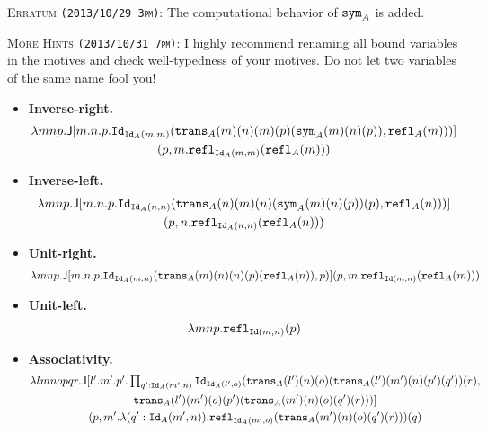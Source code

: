 \documentclass[12pt]{article}
\newcommand{\cut}[1]{}
\newcommand{\marksolution}[1]{\color{FireBrick}#1\normalcolor}%
\newcommand{\marksolution}[1]{\cut{#1}}%
\newenvironment{solution}{\trivlist \item[\hskip \labelsep{\bf
Solution:}]}{\endtrivlist}
\newcommand{\markextra}[1]{\color{DarkOliveGreen}#1\normalcolor}
\begin{document}
\markextra{
  \begin{mdframed}[style=extra]
    \textsc{Erratum \texttt{(2013/10/29 3pm)}:}
    The computational behavior of $\mathtt{sym}_A$ is added.
  \end{mdframed}
}
\markextra{
  \begin{mdframed}[style=extra]
    \textsc{More Hints \texttt{(2013/10/31 7pm)}:}
    I highly recommend renaming all bound variables in the motives
    and check well-typedness of your motives.
    Do not let two variables of the same name fool you!
  \end{mdframed}
}

\marksolution{
\begin{solution}\mbox{}
  \begin{itemize}
    \item\textbf{Inverse-right.}
      \begin{multline*}
        \lambda mnp.\mathsf{J}[m.n.p.\mathtt{Id}_{\mathtt{Id}_A(m,m)}(\mathtt{trans}_A(m)(n)(m)(p)(\mathtt{sym}_A(m)(n)(p)), \mathtt{refl}_A(m)))]
        \\(p,m.\mathtt{refl}_{\mathtt{Id}_A(m,m)}(\mathtt{refl}_A(m)))
      \end{multline*}
    \item\textbf{Inverse-left.}
      \begin{multline*}
        \lambda mnp.\mathsf{J}[m.n.p.\mathtt{Id}_{\mathtt{Id}_A(n,n)}(\mathtt{trans}_A(n)(m)(n)(\mathtt{sym}_A(m)(n)(p))(p), \mathtt{refl}_A(n)))]\\
        (p,n.\mathtt{refl}_{\mathtt{Id}_A(n,n)}(\mathtt{refl}_A(n)))
      \end{multline*}
    \item\textbf{Unit-right.}
      \begin{multline*}
        \lambda mnp.\mathsf{J}[m.n.p.\mathtt{Id}_{\mathtt{Id}_A(m,n)}(\mathtt{trans}_A(m)(n)(n)(p)(\mathtt{refl}_A(n)), p)](p,m.\mathtt{refl}_{\mathtt{Id}(m,n)}(\mathtt{refl}_A(m)))
      \end{multline*}
    \item\textbf{Unit-left.}
      \begin{multline*}
        \lambda mnp.\mathtt{refl}_{\mathtt{Id}(m,n)}(p)
      \end{multline*}
    \item\textbf{Associativity.}
      \begin{multline*}
        \textstyle
        \lambda lmnopqr.
        \mathsf{J}[l'.m'.p'.\prod_{q':\mathtt{Id}_A(m',n)}\mathtt{Id}_{\mathtt{Id}_A(l',o)}(\mathtt{trans}_A(l')(n)(o)(\mathtt{trans}_A(l')(m')(n)(p')(q'))(r),
        \\
        \mathtt{trans}_A(l')(m')(o)(p')(\mathtt{trans}_A(m')(n)(o)(q')(r)))]
        \\
        (p,m'.\lambda (q':\mathtt{Id}_A(m',n)).\mathtt{refl}_{\mathtt{Id}_A(m',o)}(\mathtt{trans}_A(m')(n)(o)(q')(r)))(q)
      \end{multline*}
  \end{itemize}
\end{solution}
}
\end{document}

